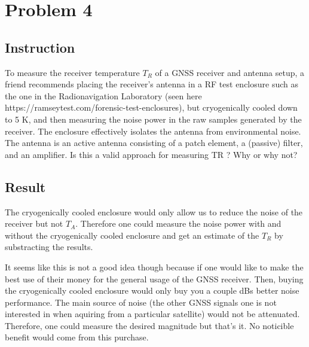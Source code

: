 \section{Problem 4}

\subsection{Instruction}

To measure the receiver temperature $T_R$ of a GNSS receiver and antenna setup,
a friend recommends placing the receiver’s antenna in a RF test enclosure such
as the one in the Radionavigation Laboratory (seen here
https://ramseytest.com/forensic-test-enclosures),
but cryogenically cooled down to 5 K, and then measuring the noise power in the
raw samples generated by the receiver. The enclosure effectively isolates the
antenna from environmental noise. The antenna is an active antenna consisting of
a patch element, a (passive) filter, and an amplifier. Is this a valid approach
for measuring TR ? Why or why not?

\subsection{Result}

The cryogenically cooled enclosure would only allow us to reduce the noise of
the receiver but not $T_A$. Therefore one could measure the noise power with and
without the cryogenically cooled enclosure and get an estimate of the $T_R$ by
substracting the results.

It seems like this is not a good idea though because if one would like to make the
best use of their money for the general usage of the GNSS receiver. Then, buying
the cryogenically cooled enclosure would only buy you a couple dBs better noise
performance. The main source of noise (the other GNSS signals one is not
interested in when aquiring from a particular satellite) would not be attenuated.
Therefore, one could measure the desired magnitude but that's it. No noticible
benefit would come from this purchase.


